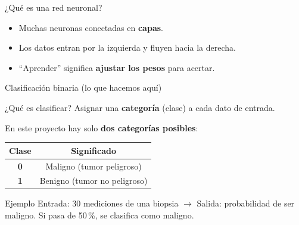 \documentclass[10pt,aspectratio=169]{beamer}
\begin{document}
\begin{frame}{¿Qué es una red neuronal?}
  \begin{itemize}
    \item Muchas neuronas conectadas en \textbf{capas}.
  \end{itemize}
  \begin{center}
  \end{center}
  \pause
  \begin{itemize}
    \item Los datos entran por la izquierda y fluyen hacia la derecha.
    \item ``Aprender'' significa \textbf{ajustar los pesos} para acertar.
  \end{itemize}
\end{frame}

\begin{frame}{Clasificación binaria (lo que hacemos aquí)}
  \begin{block}{¿Qué es clasificar?}
    Asignar una \textbf{categoría} (clase) a cada dato de entrada.
  \end{block}

  \pause

  En este proyecto hay solo \textbf{dos categorías posibles}:
  \begin{center}
    \begin{tabular}{cc}
      \toprule
      \textbf{Clase} & \textbf{Significado} \\
      \midrule
      \textcolor{rojo}{\textbf{0}} & Maligno (tumor peligroso) \\
      \textcolor{verde}{\textbf{1}} & Benigno (tumor no peligroso) \\
      \bottomrule
    \end{tabular}
  \end{center}

  \pause

  \begin{exampleblock}{Ejemplo}
    Entrada: 30 mediciones de una biopsia $\rightarrow$ Salida: probabilidad
    de ser maligno. Si pasa de 50\,\%, se clasifica como maligno.
  \end{exampleblock}
\end{frame}
\end{document}
